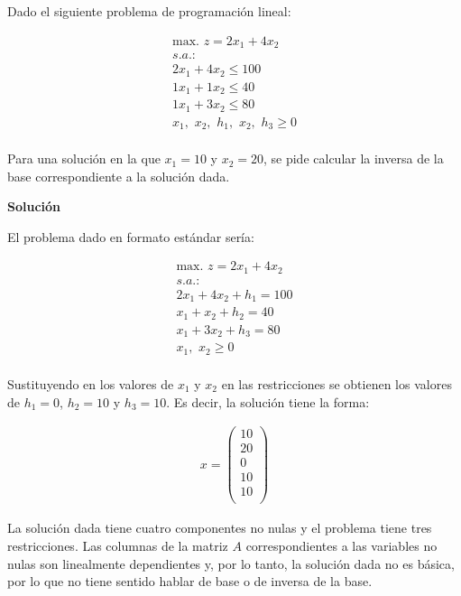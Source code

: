 Dado el siguiente problema de programación lineal:

\begin{equation}
\begin{split}
\mbox{max. } z = 2x_1 + 4x_2\\
s.a.:\\
2x_1 + 4x_2 \leq  100\\
1x_1 + 1x_2 \leq 40\\
1x_1 + 3x_2 \leq 80\\
x_1,\,\,x_2,\,\,h_1,\,\,x_2,\,\,h_3\geq 0\\
\end{split}
\end{equation}

Para una solución en la que $x_1 = 10$ y $x_2 = 20$, se pide calcular la inversa de la base correspondiente a la solución dada.

\vspace{1cm}

\noindent
\textbf{Solución}

\vspace{0.5cm}

El problema dado en formato estándar sería:

\begin{equation}
\begin{split}
\mbox{max. } z = 2x_1 + 4x_2\\
s.a.:\\
2x_1 + 4x_2 + h_1 = 100\\
 x_1 +  x_2 + h_2 = 40\\
 x_1 + 3x_2 + h_3 = 80\\
x_1,\,\,x_2\geq 0\\
\end{split}
\end{equation}

Sustituyendo en los valores de $x_1$ y $x_2$ en las restricciones se obtienen los valores de $h_1=0$, $h_2=10$ y $h_3=10$. Es decir, la solución tiene la forma:

\begin{equation}
\begin{split}
x=\begin{pmatrix}
10\\
20\\
0\\
10\\
10\\
\end{pmatrix}
\end{split}
\end{equation}


La solución dada tiene cuatro componentes no nulas y el problema tiene tres restricciones. Las columnas de la matriz $A$ correspondientes a las variables no nulas son linealmente dependientes y, por lo tanto, la solución dada no es básica, por lo que no tiene sentido hablar de base o de inversa de la base.